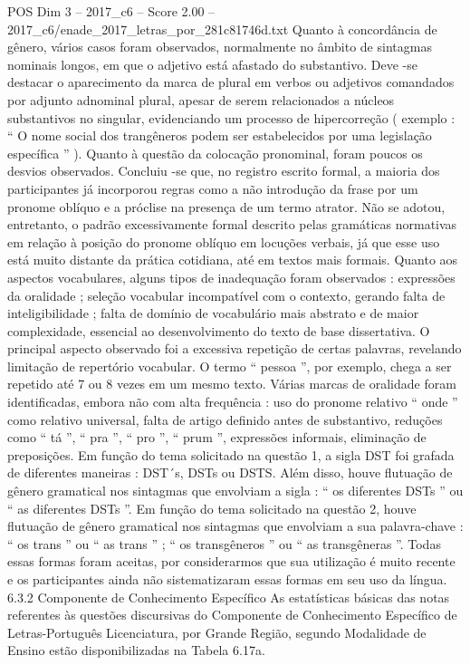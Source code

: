 \begin{textsample}{POS Dim 3 – 2017\_c6 – Score 2.00 – 2017\_c6/enade\_2017\_letras\_por\_281c81746d.txt}
Quanto à concordância de gênero, vários casos foram observados, normalmente no âmbito de sintagmas nominais longos, em que o adjetivo está afastado do substantivo.
Deve -se destacar o aparecimento da marca de plural em verbos ou adjetivos comandados por adjunto adnominal plural, apesar de serem relacionados a núcleos substantivos no singular, evidenciando um processo de hipercorreção ( exemplo : “ O nome social dos trangêneros podem ser estabelecidos por uma legislação específica ” ).
Quanto à questão da colocação pronominal, foram poucos os desvios observados.
Concluiu -se que, no registro escrito formal, a maioria dos participantes já incorporou regras como a não introdução da frase por um pronome oblíquo e a próclise na presença de um termo atrator.
Não se adotou, entretanto, o padrão excessivamente formal descrito pelas gramáticas normativas em relação à posição do pronome oblíquo em locuções verbais, já que esse uso está muito distante da prática cotidiana, até em textos mais formais.
Quanto aos aspectos vocabulares, alguns tipos de inadequação foram observados : expressões da oralidade ; seleção vocabular incompatível com o contexto, gerando falta de inteligibilidade ; falta de domínio de vocabulário mais abstrato e de maior complexidade, essencial ao desenvolvimento do texto de base dissertativa.
O principal aspecto observado foi a excessiva repetição de certas palavras, revelando limitação de repertório vocabular.
O termo “ pessoa ”, por exemplo, chega a ser repetido até 7 ou 8 vezes em um mesmo texto.
Várias marcas de oralidade foram identificadas, embora não com alta frequência : uso do pronome relativo “ onde ” como relativo universal, falta de artigo definido antes de substantivo, reduções como “ tá ”, “ pra ”, “ pro ”, “ prum ”, expressões informais, eliminação de preposições.
Em função do tema solicitado na questão 1, a sigla DST foi grafada de diferentes maneiras : DST´s, DSTs ou DSTS.
Além disso, houve flutuação de gênero gramatical nos sintagmas que envolviam a sigla : “ os diferentes DSTs ” ou “ as diferentes DSTs ”.
Em função do tema solicitado na questão 2, houve flutuação de gênero gramatical nos sintagmas que envolviam a sua palavra-chave : “ os trans ” ou “ as trans ” ; “ os transgêneros ” ou “ as transgêneras ”.
Todas essas formas foram aceitas, por considerarmos que sua utilização é muito recente e os participantes ainda não sistematizaram essas formas em seu uso da língua. 6.3.2 Componente de Conhecimento Específico As estatísticas básicas das notas referentes às questões discursivas do Componente de Conhecimento Específico de Letras-Português Licenciatura, por Grande Região, segundo Modalidade de Ensino estão disponibilizadas na Tabela 6.17a.

\end{textsample}
